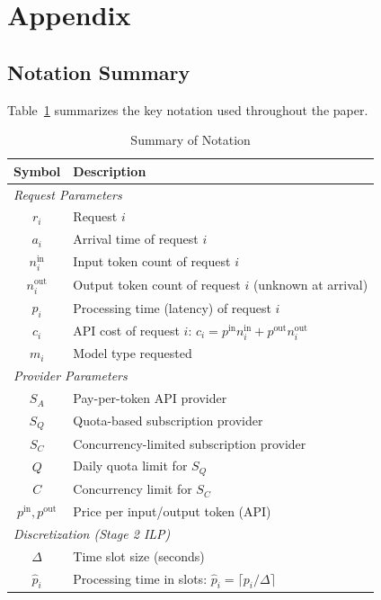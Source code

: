 \newpage
\appendix
\onecolumn
\section{Appendix}

\subsection{Notation Summary}
\label{app:notation}

Table~\ref{tab:notation} summarizes the key notation used throughout the paper.

\begin{table}[h]
\caption{Summary of Notation}
\label{tab:notation}
\begin{center}
\begin{tabular}{cl}
\toprule
\textbf{Symbol} & \textbf{Description} \\
\midrule
\multicolumn{2}{l}{\textit{Request Parameters}} \\
$r_i$ & Request $i$ \\
$a_i$ & Arrival time of request $i$ \\
$n_i^{\text{in}}$ & Input token count of request $i$ \\
$n_i^{\text{out}}$ & Output token count of request $i$ (unknown at arrival) \\
$p_i$ & Processing time (latency) of request $i$ \\
$c_i$ & API cost of request $i$: $c_i = p^{\text{in}} n_i^{\text{in}} + p^{\text{out}} n_i^{\text{out}}$ \\
$m_i$ & Model type requested \\
\midrule
\multicolumn{2}{l}{\textit{Provider Parameters}} \\
$S_A$ & Pay-per-token API provider \\
$S_Q$ & Quota-based subscription provider \\
$S_C$ & Concurrency-limited subscription provider \\
$Q$ & Daily quota limit for $S_Q$ \\
$C$ & Concurrency limit for $S_C$ \\
$p^{\text{in}}, p^{\text{out}}$ & Price per input/output token (API) \\
\midrule
\multicolumn{2}{l}{\textit{Discretization (Stage 2 ILP)}} \\
$\Delta$ & Time slot size (seconds) \\
$\hat{p}_i$ & Processing time in slots: $\hat{p}_i = \lceil p_i / \Delta \rceil$ \\

\end{tabular}
\end{center}
\end{table}
